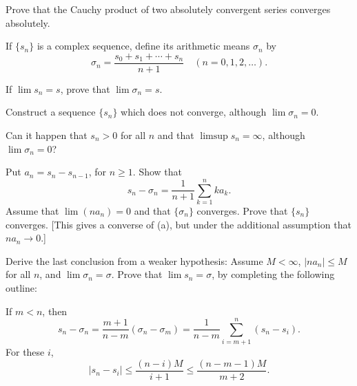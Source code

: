\begin{myExercise}
    \label{ex:3.13}
    Prove that the Cauchy product of two absolutely convergent series converges absolutely.
\end{myExercise}


\begin{myExercise}
    \label{ex:3.14}
    If $\{s_n\}$ is a complex sequence, define its arithmetic means $\sigma_n$ by 
    \begin{equation*}
        \sigma_n = \frac{s_0+s_1+\cdots+s_n}{n+1}
        \quad 
        (n=0,1,2,\dots).
    \end{equation*}
    \begin{asparaenum}[(a)]
        \item If $\lim s_n = s$, prove that $\lim \sigma_n = s$.
        \item Construct a sequence $\{s_n\}$ which does not converge, although $\lim \sigma_n= 0$.
        \item Can it happen that $s_n> 0$ for all $n$ and that $\limsup s_n = \infty$, although $\lim \sigma_n= 0$?
        \item Put $a_n = s_n - s_{n-1}$, for $n \geq 1$. 
        Show that
        \begin{equation*}
            s_n-\sigma_n = \frac{1}{n+1}\sum_{k=1}^{n}k a_k .
        \end{equation*}
        Assume that $\lim (n a_n)= 0$ and that $\{\sigma_n\}$ converges. 
        Prove that $\{s_n\}$ converges.
        [This gives a converse of (a), but under the additional assumption that $n a_n \rightarrow 0$.]
        \item Derive the last conclusion from a weaker hypothesis: 
        Assume $M < \infty$, $| n a_n | \leq M$ for all $n$, 
        and $\lim \sigma_n= \sigma$. 
        Prove that $\lim s_n = \sigma$, by completing the following outline:
        
        If $m < n$, then
        \begin{equation*}
            s_n - \sigma_n 
            = \frac{m+1}{n-m}(\sigma_n - \sigma_m)
            = \frac{  1}{n-m}\sum_{i=m+1}^{n}(s_n - s_i) .
        \end{equation*}
        For these $i$,
        \begin{equation*}
            \left| s_n - s_i \right| 
            \leq \frac{(n-i)M}{i+1} 
            \leq \frac{(n-m-1)M} {m+2} .
        \end{equation*}


\end{asparaenum}
\end{myExercise}
